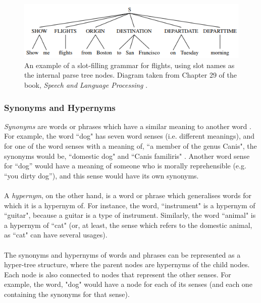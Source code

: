 \documentclass[11pt]{article}
\begin{document}
\begin{center}
\begin{figure}[H]
\begin{center}
  \includegraphics[scale=1]{slot-filling.png}
  \caption{An example of a slot-filling grammar for flights, using slot names as the internal parse tree nodes. Diagram taken from Chapter 29 of the book, \textit{Speech and Language Processing} \cite{RefWorks:107}.}
  \label{fig:slot-filling-diagram-example}
  \end{center}
\end{figure}
\end{center}


\subsubsection{Synonyms and Hypernyms}
\label{section:bg-syn-hyp}

\textit{Synonyms} are words or phrases which have a similar meaning to another word  \cite{RefWorks:44}. For example, the word ``dog" has seven word senses (i.e. different meanings), and for one of the word senses with a meaning of, ``a member of the genus Canis", the synonyms would be, ``domestic dog" and ``Canis familiris" \cite{RefWorks:45}. Another word sense for ``dog'' would have a meaning of someone who is morally reprehensible (e.g. ``you dirty dog''), and this sense would have its own synonyms.
\\
\\
A \textit{hypernym}, on the other hand, is a word or phrase which generalises words for which it is a hypernym of. For instance, the word, ``instrument" is a hypernym of ``guitar", because a guitar is a type of instrument. Similarly, the word ``animal" is a hypernym of ``cat" (or, at least, the sense which refers to the domestic animal, as ``cat" can have several usages).
\\
\\
The synonyms and hypernyms of words and phrases can be represented as a hyper-tree structure, where the parent nodes are hypernyms of the child nodes. Each node is also connected to nodes that represent the other senses. For example, the word, "dog" would have a node for each of its senses (and each one containing the synonyms for that sense).
\end{document}
